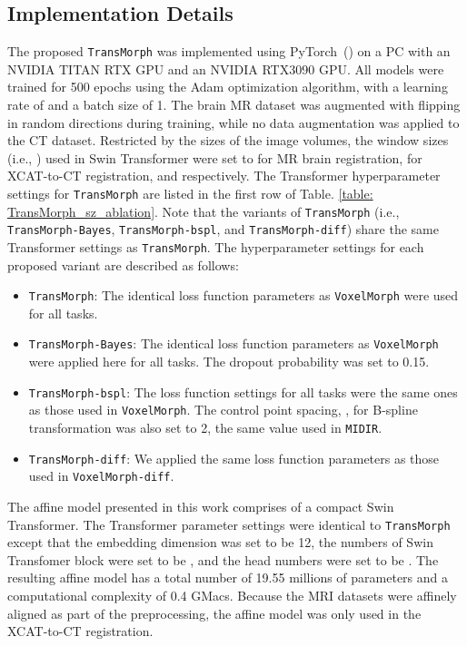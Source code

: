 \documentclass[times,twocolumn,final]{elsarticle}
\begin{document}
\subsection{Implementation Details}
The proposed \texttt{TransMorph} was implemented using PyTorch~(\cite{paszke2019pytorch}) on a PC with an NVIDIA TITAN RTX GPU and an NVIDIA RTX3090 GPU. All models were trained for 500 epochs using the Adam optimization algorithm, with a learning rate of  and a batch size of 1. The brain MR dataset was augmented with flipping in random directions during training, while no data augmentation was applied to the CT dataset. Restricted by the sizes of the image volumes, the window sizes (i.e., ) used in Swin Transformer were set to  for MR brain registration,  for XCAT-to-CT registration, and respectively. The Transformer hyperparameter settings for \texttt{TransMorph} are listed in the first row of Table. \ref{table: TransMorph_sz_ablation}. Note that the variants of \texttt{TransMorph} (i.e., \texttt{TransMorph-Bayes}, \texttt{TransMorph-bspl}, and \texttt{TransMorph-diff}) share the same Transformer settings as \texttt{TransMorph}. The hyperparameter settings for each proposed variant are described as follows:
\begin{itemize}[noitemsep]
    \item \texttt{TransMorph}: The identical loss function parameters as \texttt{VoxelMorph} were used for all tasks.
    \item \texttt{TransMorph-Bayes}: The identical loss function parameters as \texttt{VoxelMorph} were applied here for all tasks. The dropout probability was set to 0.15.
    \item \texttt{TransMorph-bspl}: The loss function settings for all tasks were the same ones as those used in \texttt{VoxelMorph}. The control point spacing, , for B-spline transformation was also set to 2, the same value used in \texttt{MIDIR}.
    \item \texttt{TransMorph-diff}: We applied the same loss function parameters as those used in \texttt{VoxelMorph-diff}.
\end{itemize}

The affine model presented in this work comprises of a compact Swin Transformer. The Transformer parameter settings were identical to \texttt{TransMorph} except that the embedding dimension was set to be 12, the numbers of Swin Transfomer block were set to be , and the head numbers were set to be . The resulting affine model has a total number of 19.55 millions of parameters and a computational complexity of 0.4 GMacs. Because the MRI datasets were affinely aligned as part of the preprocessing, the affine model was only used in the XCAT-to-CT registration.
\end{document}

